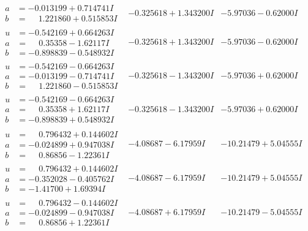 \documentclass[1p]{elsarticle_modified}
\theoremstyle{definition}
\begin{document}
$$\begin{array}{c|c|c}
\begin{aligned}
a &= -0.013199 + 0.714741 I \\
b &= \phantom{-}1.221860 + 0.515853 I\end{aligned}
 & -0.325618 + 1.343200 I & -5.97036 - 0.62000 I \\ \hline\begin{aligned}
u &= -0.542169 + 0.664263 I \\
a &= \phantom{-}0.35358 - 1.62117 I \\
b &= -0.898839 - 0.548932 I\end{aligned}
 & -0.325618 + 1.343200 I & -5.97036 - 0.62000 I \\ \hline\begin{aligned}
u &= -0.542169 - 0.664263 I \\
a &= -0.013199 - 0.714741 I \\
b &= \phantom{-}1.221860 - 0.515853 I\end{aligned}
 & -0.325618 - 1.343200 I & -5.97036 + 0.62000 I \\ \hline\begin{aligned}
u &= -0.542169 - 0.664263 I \\
a &= \phantom{-}0.35358 + 1.62117 I \\
b &= -0.898839 + 0.548932 I\end{aligned}
 & -0.325618 - 1.343200 I & -5.97036 + 0.62000 I \\ \hline\begin{aligned}
u &= \phantom{-}0.796432 + 0.144602 I \\
a &= -0.024899 + 0.947038 I \\
b &= \phantom{-}0.86856 - 1.22361 I\end{aligned}
 & -4.08687 - 6.17959 I & -10.21479 + 5.04555 I \\ \hline\begin{aligned}
u &= \phantom{-}0.796432 + 0.144602 I \\
a &= -0.352028 - 0.405762 I \\
b &= -1.41700 + 1.69394 I\end{aligned}
 & -4.08687 - 6.17959 I & -10.21479 + 5.04555 I \\ \hline\begin{aligned}
u &= \phantom{-}0.796432 - 0.144602 I \\
a &= -0.024899 - 0.947038 I \\
b &= \phantom{-}0.86856 + 1.22361 I\end{aligned}
 & -4.08687 + 6.17959 I & -10.21479 - 5.04555 I \\ \hline\begin{aligned}

\end{aligned}
\end{array}$$
\end{document}

